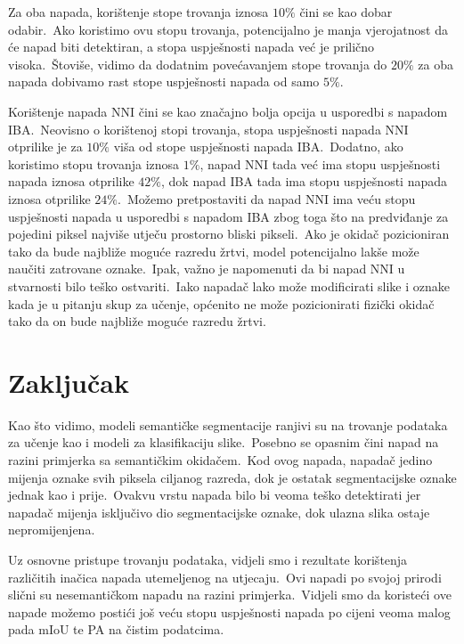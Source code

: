 \documentclass[times, utf8, seminar, numeric]{fer}
\begin{document}
\pagebreak

Za oba napada, korištenje stope trovanja iznosa $10\%$ čini se kao dobar odabir.\ 
Ako koristimo ovu stopu trovanja, potencijalno je manja vjerojatnost da će napad biti detektiran, a stopa uspješnosti napada već je prilično visoka.\ 
Štoviše, vidimo da dodatnim povećavanjem stope trovanja do $20\%$ za oba napada dobivamo rast stope uspješnosti napada od samo $5\%$.\ 
  
Korištenje napada NNI čini se kao značajno bolja opcija u usporedbi s napadom IBA.\ 
Neovisno o korištenoj stopi trovanja, stopa uspješnosti napada NNI otprilike je za $10\%$ viša od stope uspješnosti napada IBA.\
Dodatno, ako koristimo stopu trovanja iznosa $1\%$, napad NNI tada već ima stopu uspješnosti napada iznosa otprilike $42\%$, dok napad IBA tada ima stopu uspješnosti napada iznosa otprilike $24\%$.\ 
Možemo pretpostaviti da napad NNI ima veću stopu uspješnosti napada u usporedbi s napadom IBA zbog toga što na predviđanje za pojedini piksel najviše utječu prostorno bliski pikseli.\ 
Ako je okidač pozicioniran tako da bude najbliže moguće razredu žrtvi, model potencijalno lakše može naučiti zatrovane oznake.\ 
Ipak, važno je napomenuti da bi napad NNI u stvarnosti bilo teško ostvariti.\ 
Iako napadač lako može modificirati slike i oznake kada je u pitanju skup za učenje, općenito ne može pozicionirati fizički okidač tako da on bude najbliže moguće razredu žrtvi.\

\chapter{Zaključak}

Kao što vidimo, modeli semantičke segmentacije ranjivi su na trovanje podataka za učenje kao i modeli za klasifikaciju slike.\ 
Posebno se opasnim čini napad na razini primjerka sa semantičkim okidačem.\ 
Kod ovog napada, napadač jedino mijenja oznake svih piksela ciljanog razreda, dok je ostatak segmentacijske oznake jednak kao i prije.\ 
Ovakvu vrstu napada bilo bi veoma teško detektirati jer napadač mijenja isključivo dio segmentacijske oznake, dok ulazna slika ostaje nepromijenjena.\ 
  
Uz osnovne pristupe trovanju podataka, vidjeli smo i rezultate korištenja različitih inačica napada utemeljenog na utjecaju.\ 
Ovi napadi po svojoj prirodi slični su nesemantičkom napadu na razini primjerka.\ 
Vidjeli smo da koristeći ove napade možemo postići još veću stopu uspješnosti napada po cijeni veoma malog pada mIoU te PA na čistim podatcima.\
\end{document}
